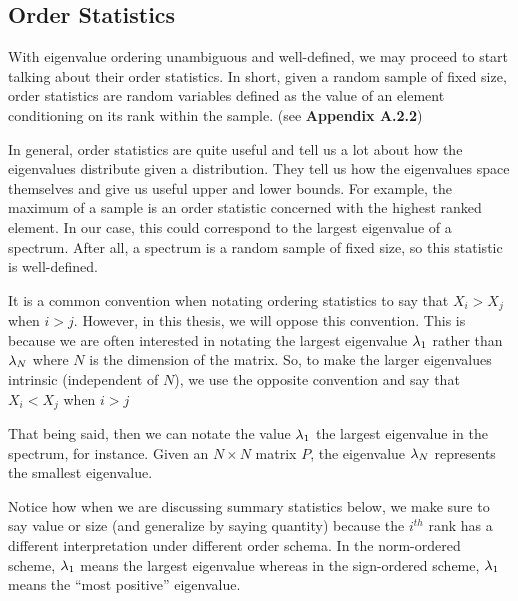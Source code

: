 \newpage
\subsection{Order Statistics}


With eigenvalue ordering unambiguous and well-defined, we may proceed to start talking about their order statistics.
In short, given a random sample of fixed size, order statistics are random variables defined as the value of an element conditioning on its rank within the sample. (see \textbf{Appendix A.2.2})

In general, order statistics are quite useful and tell us a lot about how the eigenvalues distribute given a distribution.
They tell us how the eigenvalues space themselves and give us useful upper and lower bounds.
For example, the maximum of a sample is an order statistic concerned with the highest ranked element.
In our case, this could correspond to the largest eigenvalue of a spectrum. After all, a spectrum is a random sample of fixed size, so this statistic is well-defined.

\begin{remark}[Indices]
It is a common convention when notating ordering statistics to say that $X_i > X_j$ when $i > j$. However, in this thesis, we will oppose this convention.
This is because we are often interested in notating the largest eigenvalue $\lambda_1$ rather than $\lambda_N$ where $N$ is the dimension of the matrix.
So, to make the larger eigenvalues intrinsic (independent of $N$), we use the opposite convention and say that $X_i < X_j$ when $i > j$
\end{remark}

That being said, then we can notate the value $\lambda_1$ the largest eigenvalue in the spectrum, for instance.
Given an $N \times N$ matrix $P$, the eigenvalue $\lambda_N$ represents the smallest eigenvalue.

\begin{warning}
Notice how when we are discussing summary statistics below, we make sure to say value or size (and generalize by saying quantity) because the $i^{th}$ rank has a different interpretation under different order schema.
In the norm-ordered scheme, $\lambda_1$ means the largest eigenvalue whereas in the sign-ordered scheme, $\lambda_1$ means the ``most positive'' eigenvalue.
\end{warning}


